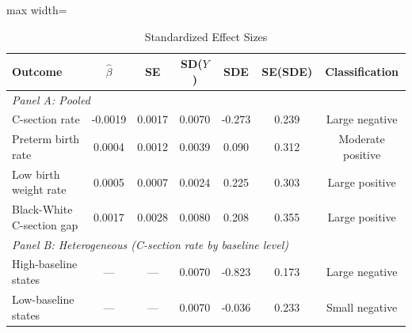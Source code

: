 \begin{table}[t]
\centering
\caption{Standardized Effect Sizes}
\label{tab:sde}
\begin{adjustbox}{max width=\textwidth}
\begin{tabular}{lcccccc}
\hline\hline
Outcome & $\hat{\beta}$ & SE & SD($Y$) & SDE & SE(SDE) & Classification \\
\hline
\multicolumn{7}{l}{\textit{Panel A: Pooled}} \\
C-section rate & -0.0019 & 0.0017 & 0.0070 & -0.273 & 0.239 & Large negative \\
Preterm birth rate & 0.0004 & 0.0012 & 0.0039 & 0.090 & 0.312 & Moderate positive \\
Low birth weight rate & 0.0005 & 0.0007 & 0.0024 & 0.225 & 0.303 & Large positive \\
Black-White C-section gap & 0.0017 & 0.0028 & 0.0080 & 0.208 & 0.355 & Large positive \\
\hline
\multicolumn{7}{l}{\textit{Panel B: Heterogeneous (C-section rate by baseline level)}} \\
High-baseline states & --- & --- & 0.0070 & -0.823 & 0.173 & Large negative \\
Low-baseline states & --- & --- & 0.0070 & -0.036 & 0.233 & Small negative \\
\hline\hline
\end{tabular}
\end{adjustbox}
\begin{minipage}{0.95\textwidth}
\vspace{0.3em}
\begin{itemize}[leftmargin=*,nosep]

\end{itemize}
\end{minipage}
\end{table}
